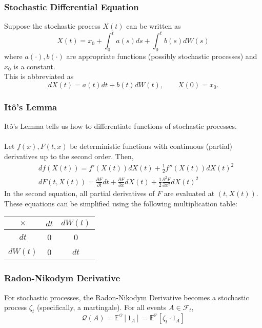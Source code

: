\documentclass[11pt]{article}
\newcommand{\E}{\mathbb{E}}
\newcommand{\PR}{\mathbb{P}}
\newcommand{\Q}{\mathcal{Q}}
\begin{document}
	\subsubsection{Stochastic Differential Equation}
	Suppose the stochastic process \( X(t) \) can be written as
	\[	X(t) = x_0 + \int_{0}^{t} a(s) ds + \int_{0}^{t} b(s) dW(s)\]
	where \( a(\cdot), b(\cdot) \) are appropriate functions (possibly stochastic processes) and \( x_0 \) is a constant.\\
	This is abbreviated as
	\[	dX(t) = a(t) dt + b(t) dW(t), \qquad X(0) = x_0.\]
	\subsubsection{It\^{o}'s Lemma}
	It\^{o}'s Lemma tells us how to differentiate functions of stochastic processes.
	\\\\Let \( f(x), F(t, x) \) be deterministic functions with continuous (partial) derivatives up to the second order. Then, 
	\begin{align*}
		& df(X(t)) = f'(X(t)) dX(t) + \frac{1}{2}f''(X(t)) dX(t)^2 \\
		& dF(t, X(t)) = \frac{\partial F}{\partial t}dt + \frac{\partial F}{\partial x} dX(t) + \frac{1}{2}\frac{\partial^2 F}{\partial x^2} dX(t)^2
	\end{align*}
	In the second equation, all partial derivatives of \( F \) are evaluated at \( (t, X(t)) \).\\
	These equations can be simplified using the following multiplication table:
	\begin{center}
		\begin{tabular}{ccc}
			\( \times \) & \( dt \) & \( dW(t) \)\\
			\hline
			\hline
			\( dt \) & 0 & 0 \\
			\hline
			\( dW(t) \) & 0 & $dt$ \\
			\hline
			\end{tabular}
		\end{center}
	\subsubsection{Radon-Nikodym Derivative}
	For stochastic processes, the Radon-Nikodym Derivative becomes a stochastic process \( \zeta_t \) (specifically, a martingale). For all events \( A\in\mathcal{F}_t \),
	\[	\Q(A) = \E^{\Q}[1_{A}] = \E^{\PR}[\zeta_t \cdot1_{A}]\]
\end{document}
